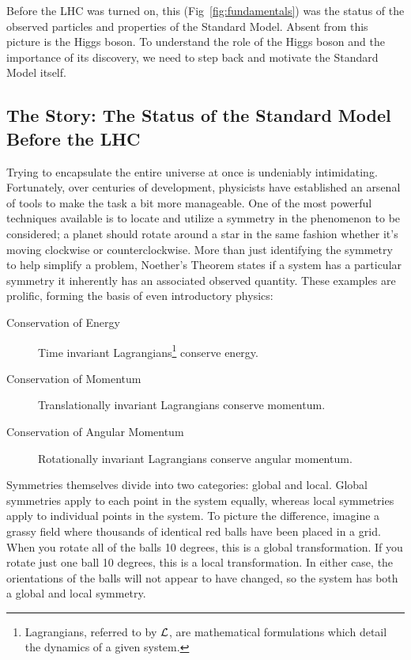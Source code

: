 Before the LHC was turned on, this (Fig~\ref{fig:fundamentals}) was the status of the observed particles and properties of the Standard Model. Absent from this picture is the Higgs boson. To understand the role of the Higgs boson and the importance of its discovery, we need to step back and motivate the Standard Model itself.

\subsection{The Story: The Status of the Standard Model Before the LHC}
\label{sec:SMpreLHC}

Trying to encapsulate the entire universe at once is undeniably intimidating. Fortunately, over centuries of development, physicists have established an arsenal of tools to make the task a bit more manageable. One of the most powerful techniques available is to locate and utilize a symmetry in the phenomenon to be considered; a planet should rotate around a star in the same fashion whether it's moving clockwise or counterclockwise. More than just identifying the symmetry to help simplify a problem, Noether's Theorem states if a system has a particular symmetry it inherently has an associated observed quantity. These examples are prolific, forming the basis of even introductory physics:

\begin{description}
\item[Conservation of Energy]
Time invariant Lagrangians\footnote{Lagrangians, referred to by $\mathcal{L}$, are mathematical formulations which detail the dynamics of a given system.} conserve energy.
\item[Conservation of Momentum]
Translationally invariant Lagrangians conserve momentum.
\item[Conservation of Angular Momentum]
Rotationally invariant Lagrangians conserve angular momentum.
\end{description}

Symmetries themselves divide into two categories: global and local. Global symmetries apply to each point in the system equally, whereas local symmetries apply to individual points in the system. To picture the difference, imagine a grassy field where thousands of identical red balls have been placed in a grid. When you rotate all of the balls 10 degrees, this is a global transformation. If you rotate just one ball 10 degrees, this is a local transformation. In either case, the orientations of the balls will not appear to have changed, so the system has both a global and local symmetry.

